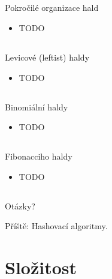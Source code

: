 \documentclass{beamer}
\begin{document}
\subsection{}
\begin{frame}{Pokročilé organizace hald}
\begin{itemize}
\item TODO
\end{itemize}
\end{frame}

\subsection{}
\begin{frame}{Levicové (leftist) haldy}
\begin{itemize}
\item TODO
\end{itemize}
\end{frame}

\subsection{}
\begin{frame}{Binomiální haldy}
\begin{itemize}
\item TODO
\end{itemize}
\end{frame}

\subsection{}
\begin{frame}{Fibonacciho haldy}
\begin{itemize}
\item TODO
\end{itemize}
\end{frame}

\subsection{}
\begin{frame}{Otázky?}
\begin{center}
Příště: Hashovací algoritmy.
\end{center}
\end{frame}

\section{Složitost}
\end{document}
